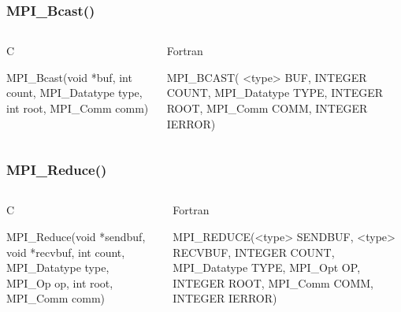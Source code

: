 \documentclass[handout]{beamer}
\begin{document}
\begin{frame}[fragile]
\frametitle{MPI\_Bcast()}
   \begin{columns}[T]
    \begin{column}{5cm}
     \begin{block}{C}
      \begin{semiverbatim}
MPI\_Bcast(void   *buf,
           int  count,
  MPI\_Datatype   type,
           int   root,
      MPI\_Comm   comm)
      \end{semiverbatim}
     \end{block}
    \end{column}
    \begin{column}{5cm}
     \begin{block}{Fortran}
      \begin{semiverbatim}
MPI\_BCAST( <type>    BUF,
         INTEGER   COUNT,
    MPI\_Datatype    TYPE,
         INTEGER    ROOT,
        MPI\_Comm    COMM,
         INTEGER  IERROR)
      \end{semiverbatim}
     \end{block}
    \end{column}
   \end{columns}
\end{frame}
\begin{frame}[fragile]
\frametitle{MPI\_Reduce()}
   \begin{columns}[T]
    \begin{column}{5cm}
     \begin{block}{C}
      \begin{semiverbatim}
MPI\_Reduce(void *sendbuf,
           void *recvbuf,
            int    count,
   MPI\_Datatype     type,
         MPI\_Op       op,
            int     root,
       MPI\_Comm     comm)
      \end{semiverbatim}
     \end{block}
    \end{column}
    \begin{column}{5cm}
     \begin{block}{Fortran}
      \begin{semiverbatim}
MPI\_REDUCE(<type> SENDBUF,
           <type> RECVBUF,
          INTEGER  COUNT,
     MPI\_Datatype   TYPE,
          MPI\_Opt     OP,
          INTEGER   ROOT,
         MPI\_Comm   COMM,
          INTEGER IERROR)
      \end{semiverbatim}
     \end{block}
    \end{column}
   \end{columns}
%
\end{frame}
\end{document}
